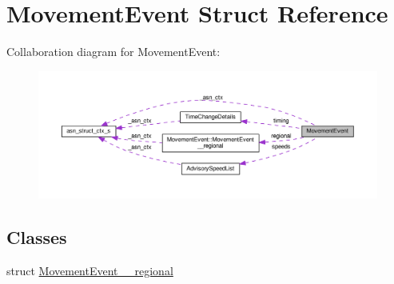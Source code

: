 \hypertarget{structMovementEvent}{}\section{Movement\+Event Struct Reference}
\label{structMovementEvent}


Collaboration diagram for Movement\+Event\+:\nopagebreak
\begin{figure}[H]
\begin{center}
\leavevmode
\includegraphics[width=350pt]{structMovementEvent__coll__graph}
\end{center}
\end{figure}
\subsection*{Classes}
\begin{DoxyCompactItemize}
\item 
struct \hyperlink{structMovementEvent_1_1MovementEvent____regional}{Movement\+Event\+\_\+\+\_\+regional}
\end{DoxyCompactItemize}
